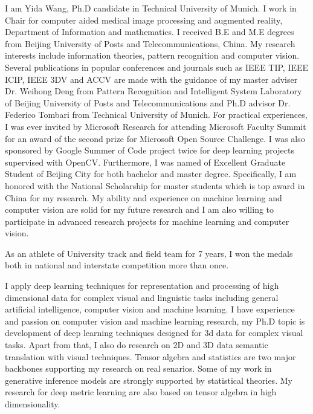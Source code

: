 \documentclass[11pt, a4paper]{awesome-cv} %
\begin{document}
\makecvheader %


I am Yida Wang, Ph.D candidate in Technical University of Munich. I work in Chair for computer aided medical image processing and augmented reality, Department of Information and mathematics. 
I received B.E and M.E degrees from Beijing University of Posts and Telecommunications, China.
My research interests include information theories, pattern recognition and computer vision. 
Several publications in popular conferences and journals such as IEEE TIP, IEEE ICIP, IEEE 3DV and ACCV are made with the guidance of my master adviser Dr. Weihong Deng from Pattern Recognition and Intelligent System Laboratory of Beijing University of Posts and Telecommunications and Ph.D advisor Dr. Federico Tombari from Technical University of Munich. 
For practical experiences, I was ever invited by Microsoft Research for attending Microsoft Faculty Summit for an award of the second prize for Microsoft Open Source Challenge. I was also sponsored by Google Summer of Code project twice for deep learning projects supervised with OpenCV. 
Furthermore, I was named of Excellent Graduate Student of Beijing City for both bachelor and master degree. Specifically, I am honored with the National Scholarship for master students which is top award in China for my research. 
My ability and experience on machine learning and computer vision are solid for my future research and I am also willing to participate in advanced research projects for machine learning and computer vision. 

As an athlete of University track and field team for 7 years, I won the medals both in national and interstate competition more than once. 


I apply deep learning techniques for representation and processing of high dimensional data for complex visual and linguistic tasks including general artificial intelligence, computer vision and machine learning.
I have experience and passion on computer vision and machine learning research, my Ph.D topic is development of deep learning techniques designed for 3d data for complex visual tasks. 
Apart from that, I also do research on 2D and 3D data semantic translation with visual techniques.
Tensor algebra and statistics are two major backbones supporting my research on real senarios. Some of my work in generative inference models are strongly supported by statistical theories. My research for deep metric learning are also based on tensor algebra in high dimensionality.
\end{document}
